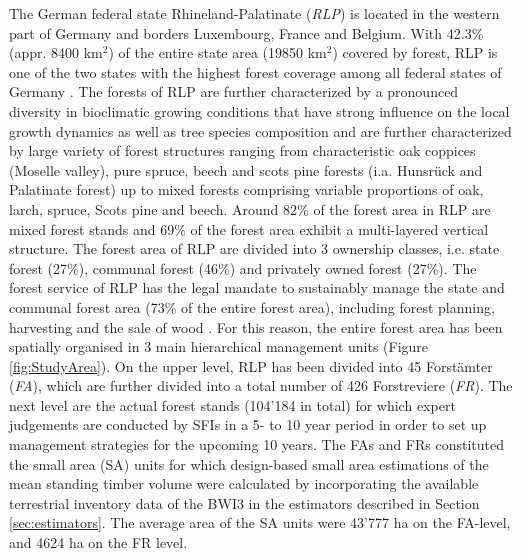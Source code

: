 The German federal state Rhineland-Palatinate (\textit{RLP}) is located in the western part of Germany and borders Luxembourg, France and Belgium. With 42.3\% (appr. 8400 km$^2$) of the entire state area (19850 km$^2$) covered by forest, RLP is one of the two states with the highest forest coverage among all federal states of Germany \citep{bwi3}. The forests of RLP are further characterized by a pronounced diversity in bioclimatic growing conditions that have strong influence on the local growth dynamics as well as tree species composition \citep{gauer2005} and are further characterized by large variety of forest structures ranging from characteristic oak coppices (Moselle valley), pure spruce, beech and scots pine forests (i.a. Hunsr{\"u}ck and Palatinate forest) up to mixed forests comprising variable proportions of oak, larch, spruce, Scots pine and beech. Around 82\% of the forest area in RLP are mixed forest stands and 69\% of the forest area exhibit a multi-layered vertical structure. The forest area of RLP are divided into 3 ownership classes, i.e. state forest (27\%), communal forest (46\%) and privately owned forest (27\%). The forest service of RLP has the legal mandate to sustainably manage the state and communal forest area (73\% of the entire forest area), including forest planning, harvesting and the sale of wood \citep{lwaldg_rlp}. For this reason, the entire forest area has been spatially organised in 3 main hierarchical management units (Figure \ref{fig:StudyArea}). On the upper level, RLP has been divided into 45 Forst{\"a}mter (\textit{FA}), which are further divided into a total number of 426 Forstreviere (\textit{FR}). The next level are the actual forest stands (104'184 in total) for which expert judgements are conducted by SFIs in a 5- to 10 year period in order to set up management strategies for the upcoming 10 years. The FAs and FRs constituted the small area (SA) units for which design-based small area estimations of the mean standing timber volume were calculated by incorporating the available terrestrial inventory data of the BWI3 in the estimators described in Section \ref{sec:estimators}. The average area of the SA units were 43'777 ha on the FA-level, and 4624 ha on the FR level.



